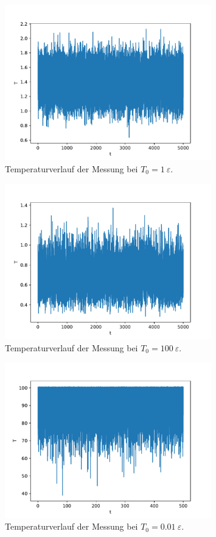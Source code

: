 \begin{figure}
    \centering
    \includegraphics[width=0.8\textwidth]{A1/build/messung1_T.pdf}

    \caption{Temperaturverlauf der Messung bei $T_0 = 1\:\varepsilon$.}
    \label{fig:messung_T=1_temp}
\end{figure}
\begin{figure}
    \centering
    \includegraphics[width=0.8\textwidth]{A1/build/messung001_T.pdf}
    \caption{Temperaturverlauf der Messung bei $T_0 = 100\:\varepsilon$.}
    \label{fig:messung_T=1e2_temp}
\end{figure}
\begin{figure}
    \centering
    \includegraphics[width=0.8\textwidth]{A1/build/messung100_T.pdf}
    \caption{Temperaturverlauf der Messung bei $T_0 = 0.01\:\varepsilon$.}
    \label{fig:messung_T=1e-2_temp}
\end{figure}


